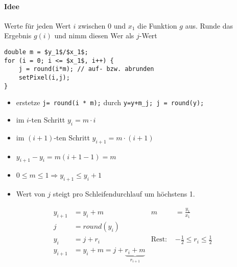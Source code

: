 \paragraph*{Idee} Werte für jeden Wert $i$ zwischen 0 und $x_1$ die Funktion $g$ aus. Runde das Ergebnis $g(i)$ und nimm
	diesen Wer als $j$-Wert
\begin{lstlisting}[mathescape=true]
double m = $y_1$/$x_1$;
for (i = 0; i <= $x_1$, i++) {
	j = round(i*m);	// auf- bzw. abrunden
	setPixel(i,j);
}
	\end{lstlisting}
	\begin{itemize}
	 \item erstetze \lstinline!j= round(i * m);! durch \lstinline!y=y+m_j; j = round(y);!
	 \item im $i$-ten Schritt $y_i = m \cdot i$
	 \item im $(i+1)$-ten Schritt $y_{i+1} = m \cdot (i+1)$
	 \item $y_{i+1} - y_i = m(i+1-1) = m$
	 \item $0 \le m \le 1 \Rightarrow y_{i+1} \le y_{i} + 1$
	 \item Wert von $j$ steigt pro Schleifendurchlauf um höchstens 1.
	\end{itemize}
	\begin{align*}
	 y_{i+1} &= y_i + m	& m &= \frac{y_1}{x_1}\\
	 j &= round(y_i)\\
	 y_i &= j + r_i & \text{Rest: } & -\frac{1}{2} \le r_i \le \frac{1}{2}\\
	 y_{i+1} &= y_i + m = j + \underbrace{r_i + m}_{r_{i+1}}
	\end{align*}
